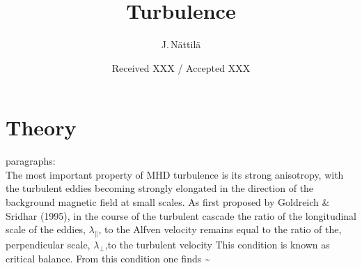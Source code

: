 \documentclass{aa}
\begin{document}
\title{Turbulence}

\author{J.\,N\"attil\"a}


\date{Received XXX / Accepted XXX}





\maketitle



\section{Theory}\label{sect:theory}

\citep{Sobacchi_2019} paragraphs: \\

The most important property of MHD turbulence is its strong anisotropy, with the turbulent eddies becoming strongly elongated in the direction of the background magnetic field at small scales.
As first proposed by Goldreich \& Sridhar (1995), in the course of the turbulent cascade the ratio of the longitudinal scale of the eddies, $\lambda_{\parallel}$, to the Alfven velocity remains equal to the ratio of the, perpendicular scale, $\lambda_{\perp}$,to the turbulent velocity 
This condition is known as critical balance. 
From this condition one finds
\be
\frac{\lambda_{\perp}}{\lambda_{\parallel}} \sim {}
\ee
\end{document}
